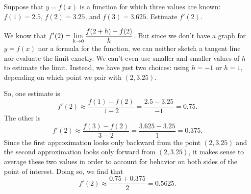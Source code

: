 \begin{example} \label{Ex:2.1.Eg2}
Suppose that $y = f(x)$ is a function for which three values are known:  $f(1) = 2.5$, $f(2) = 3.25$, and $f(3) = 3.625$.  Estimate $f'(2)$.

\solution We know that $\displaystyle f'(2) = \lim_{h \to 0} \frac{f(2+h) - f(2)}{h}$.  But since we don't have a graph for $y = f(x)$ nor a formula for the function, we can neither sketch a tangent line nor evaluate the limit exactly.  We can't even use smaller and smaller values of $h$ to estimate the limit.  Instead, we have just two choices:  using $h = -1$ or $h = 1$, depending on which point we pair with $(2,3.25)$.

So, one estimate is
$$f'(2) \approx \frac{f(1)-f(2)}{1-2} = \frac{2.5-3.25}{-1} = 0.75.$$
The other is
$$f'(2) \approx \frac{f(3)-f(2)}{3-2} = \frac{3.625-3.25}{1} = 0.375.$$
Since the first approximation looks only backward from the point $(2,3.25)$ and the second approximation looks only forward from $(2,3.25)$, it makes sense to average these two values in order to account for behavior on both sides of the point of interest.  Doing so, we find that
$$f'(2) \approx \frac{0.75 + 0.375}{2} = 0.5625.$$
\end{example}